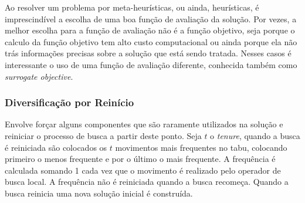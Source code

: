 \documentclass[conference]{IEEEtran}
\begin{document}
        Ao resolver um problema por meta-heurísticas, ou ainda, heurísticas, é imprescindível a escolha de uma boa função de avaliação da solução. Por vezes, a melhor escolha para a função de
        avaliação não é a função objetivo, seja porque o calculo da função objetivo tem alto custo computacional ou ainda porque ela não trás informações precisas sobre a solução que está sendo
        tratada. Nesses casos é interessante o uso de uma função de avaliação diferente, conhecida também como {\it surrogate objective}.



    \subsubsection{Diversificação por Reinício}

        Envolve forçar alguns componentes que são raramente utilizados na solução e reiniciar o processo de busca a partir deste ponto.  Seja $t$ o \textit{tenure}, quando a busca é
        reiniciada são colocados os $t$ movimentos mais frequentes no tabu, colocando primeiro o menos frequente e por o último o mais frequente. A frequência é calculada somando 1 cada vez
        que o movimento é realizado pelo operador de busca local. A frequência não é reiniciada quando a busca recomeça. Quando a busca reinicia uma nova solução inicial é construída.

{}

\end{document}
